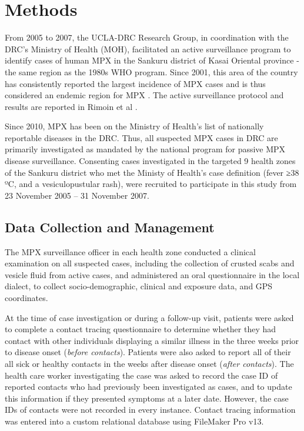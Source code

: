 \section{Methods}

From 2005 to 2007, the UCLA-DRC Research Group, in coordination with the DRC’s Ministry of Health (MOH), facilitated an active surveillance program to identify cases of human MPX in the Sankuru district of Kasai Oriental province - the same region as the 1980s WHO program. Since 2001, this area of the country has consistently reported the largest incidence of MPX cases and is thus considered an endemic region for MPX \cite{Rimoin2010}. The active surveillance protocol and results are reported in Rimoin et al \cite{Rimoin2010}.

Since 2010, MPX has been on the Ministry of Health's list of nationally reportable diseases in the DRC. Thus, all suspected MPX cases in DRC are primarily investigated as mandated by the national program for passive MPX disease surveillance. Consenting cases investigated in the targeted 9 health zones of the Sankuru district who met the  Ministy of Health’s case definition (fever ≥38 ºC, and a vesiculopustular rash), were recruited to participate in this study from 23 November 2005 – 31 November 2007. 

\subsection{Data Collection and Management}
The MPX surveillance officer in each health zone conducted a clinical examination on all suspected cases, including the collection of crusted scabs and vesicle fluid from active cases, and administered an oral questionnaire in the local dialect, to collect socio-demographic, clinical and exposure data, and GPS coordinates.

At the time of case investigation or during a follow-up visit, patients were asked to complete a contact tracing questionnaire to determine whether they had contact with other individuals displaying a similar illness in the three weeks prior to disease onset  (\textit{before contacts}). Patients were also asked to report all of their all sick or healthy contacts in the weeks after disease onset (\textit{after contacts}). The health care worker investigating the case was asked to record the case ID of reported contacts who had previously been investigated as cases, and to update this information if they presented symptoms at a later date. However, the case IDs of contacts were not recorded in every instance. Contact tracing information was entered into a custom relational database using FileMaker Pro v13.

